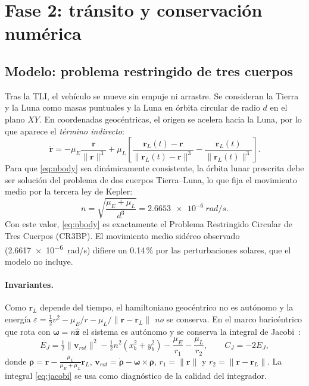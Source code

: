 \documentclass[11pt,a4paper]{article}
\newcommand{\vect}[1]{\mathbf{#1}}
\newcommand{\uvec}[1]{\hat{\mathbf{#1}}}
\begin{document}
\section{Fase 2: tránsito y conservación numérica}\label{sec:f2}
\subsection{Modelo: problema restringido de tres cuerpos}
Tras la TLI, el vehículo se mueve sin empuje ni arrastre. Se consideran la Tierra y la Luna como masas puntuales y la Luna en órbita circular de radio $d$ en el plano $XY$. En coordenadas geocéntricas, el origen se acelera hacia la Luna, por lo que aparece el \emph{término indirecto}:
\begin{equation}
\ddot{\vect r} = -\mu_E\frac{\vect r}{\|\vect r\|^3}
+\mu_L\left[\frac{\vect r_L(t)-\vect r}{\|\vect r_L(t)-\vect r\|^3}-\frac{\vect r_L(t)}{\|\vect r_L(t)\|^3}\right].
\label{eq:nbody}
\end{equation}
Para que \eqref{eq:nbody} sea dinámicamente consistente, la órbita lunar prescrita debe ser solución del problema de dos cuerpos Tierra--Luna, lo que fija el movimiento medio por la tercera ley de Kepler:
\begin{equation}
n=\sqrt{\frac{\mu_E+\mu_L}{d^3}}=\SI{2.6653e-6}{rad/s}.
\end{equation}
Con este valor, \eqref{eq:nbody} es exactamente el Problema Restringido Circular de Tres Cuerpos (CR3BP). El movimiento medio sidéreo observado (\SI{2.6617e-6}{rad/s}) difiere un 0.14\,\% por las perturbaciones solares, que el modelo no incluye.

\paragraph{Invariantes.} Como $\vect r_L$ depende del tiempo, el hamiltoniano geocéntrico no es autónomo y la energía $\varepsilon=\tfrac12v^2-\mu_E/r-\mu_L/\|\vect r-\vect r_L\|$ \emph{no} se conserva. En el marco baricéntrico que rota con $\vect\omega=n\uvec z$ el sistema es autónomo y se conserva la integral de Jacobi~\cite{szebehely1967}:
\begin{equation}
E_J=\tfrac12\|\vect v_{rot}\|^2-\tfrac12n^2(x_b^2+y_b^2)-\frac{\mu_E}{r_1}-\frac{\mu_L}{r_2},\qquad C_J=-2E_J,
\label{eq:jacobi}
\end{equation}
donde $\vect\rho=\vect r-\tfrac{\mu_L}{\mu_E+\mu_L}\vect r_L$, $\vect v_{rot}=\dot{\vect\rho}-\vect\omega\times\vect\rho$, $r_1=\|\vect r\|$ y $r_2=\|\vect r-\vect r_L\|$. La integral \eqref{eq:jacobi} se usa como diagnóstico de la calidad del integrador.
\end{document}
